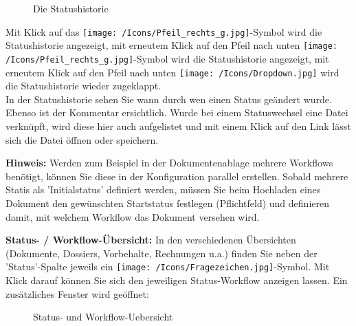\begin{figure}[H]
\caption{Die Statushistorie}
\end{figure}

Mit Klick auf das \texttt{[image: /Icons/Pfeil\_rechts\_g.jpg]}-Symbol wird die Statushistorie  angezeigt, mit erneutem Klick auf den Pfeil nach unten \texttt{[image: /Icons/Pfeil\_rechts\_g.jpg]}-Symbol wird die Statushistorie angezeigt, mit erneutem Klick auf den Pfeil nach unten \texttt{[image: /Icons/Dropdown.jpg]} wird die Statushistorie wieder zugeklappt.\\
In der Statushistorie sehen Sie wann durch wen einen Status geändert wurde. Ebenso ist der Kommentar ersichtlich. Wurde bei einem Statuswechsel eine Datei verknüpft, wird diese hier auch aufgelistet  und mit einem Klick auf den Link lässt sich die Datei öffnen oder speichern.

\vspace{\baselineskip}

\textbf{Hinweis:} Werden zum Beispiel in der Dokumentenablage mehrere Workflows benötigt, können Sie diese in der Konfiguration parallel erstellen. Sobald mehrere Statis als 'Initialstatus' definiert werden, müssen Sie beim Hochladen eines Dokument den gewünschten Startstatus festlegen (Pflichtfeld) und definieren damit, mit welchem Workflow das Dokument versehen wird.

\vspace{\baselineskip}

\textbf{Status- / Workflow-Übersicht:} In den verschiedenen Übersichten (Dokumente, Dossiers, Vorbehalte, Rechnungen u.a.) finden Sie neben der 'Status'-Spalte jeweils ein \texttt{[image: /Icons/Fragezeichen.jpg]}-Symbol. Mit Klick darauf können Sie sich den jeweiligen Status-Workflow anzeigen lassen. Ein zusätzliches Fenster wird geöffnet:

\begin{figure}[H]
\caption{Status- und Workflow-Uebersicht}
\end{figure}


